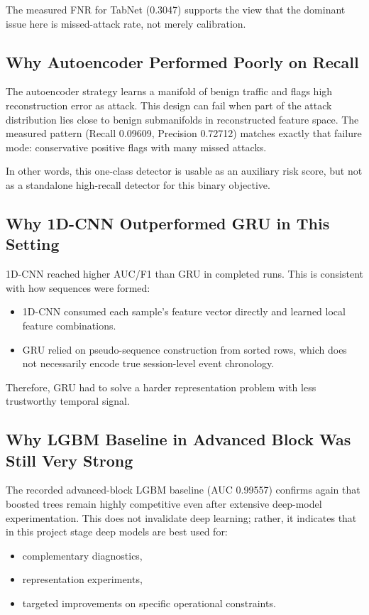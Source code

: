 \documentclass[10pt,journal]{IEEEtran}
\begin{document}
The measured FNR for TabNet (0.3047) supports the view that the dominant issue here is missed-attack rate, not merely calibration.

\subsection{Why Autoencoder Performed Poorly on Recall}
The autoencoder strategy learns a manifold of benign traffic and flags high reconstruction error as attack. This design can fail when part of the attack distribution lies close to benign submanifolds in reconstructed feature space. The measured pattern (Recall 0.09609, Precision 0.72712) matches exactly that failure mode: conservative positive flags with many missed attacks.

In other words, this one-class detector is usable as an auxiliary risk score, but not as a standalone high-recall detector for this binary objective.

\subsection{Why 1D-CNN Outperformed GRU in This Setting}
1D-CNN reached higher AUC/F1 than GRU in completed runs. This is consistent with how sequences were formed:
\begin{itemize}
\item 1D-CNN consumed each sample's feature vector directly and learned local feature combinations.
\item GRU relied on pseudo-sequence construction from sorted rows, which does not necessarily encode true session-level event chronology.
\end{itemize}

Therefore, GRU had to solve a harder representation problem with less trustworthy temporal signal.

\subsection{Why LGBM Baseline in Advanced Block Was Still Very Strong}
The recorded advanced-block LGBM baseline (AUC 0.99557) confirms again that boosted trees remain highly competitive even after extensive deep-model experimentation. This does not invalidate deep learning; rather, it indicates that in this project stage deep models are best used for:
\begin{itemize}
\item complementary diagnostics,
\item representation experiments,
\item targeted improvements on specific operational constraints.
\end{itemize}
\end{document}
